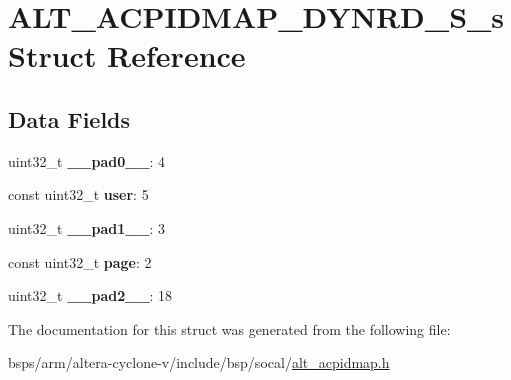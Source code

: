 \hypertarget{structALT__ACPIDMAP__DYNRD__S__s}{}\section{A\+L\+T\+\_\+\+A\+C\+P\+I\+D\+M\+A\+P\+\_\+\+D\+Y\+N\+R\+D\+\_\+\+S\+\_\+s Struct Reference}
\label{structALT__ACPIDMAP__DYNRD__S__s}
\subsection*{Data Fields}
\begin{DoxyCompactItemize}
\item 
\mbox{\label{structALT__ACPIDMAP__DYNRD__S__s_ac4a6a85262991dc5557f646f85ad46e1}} 
uint32\+\_\+t {\bfseries \+\_\+\+\_\+pad0\+\_\+\+\_\+}\+: 4
\item 
\mbox{\label{structALT__ACPIDMAP__DYNRD__S__s_a934eaadcaa4287dd554e69e2fd5b7040}} 
const uint32\+\_\+t {\bfseries user}\+: 5
\item 
\mbox{\label{structALT__ACPIDMAP__DYNRD__S__s_a8cd0899f9a42e5da76f55bffbe92ee62}} 
uint32\+\_\+t {\bfseries \+\_\+\+\_\+pad1\+\_\+\+\_\+}\+: 3
\item 
\mbox{\label{structALT__ACPIDMAP__DYNRD__S__s_a935330a9e9a0fc207be6679eaaea85c8}} 
const uint32\+\_\+t {\bfseries page}\+: 2
\item 
\mbox{\label{structALT__ACPIDMAP__DYNRD__S__s_a0fd31db34608a4b78cd8e6d23986f129}} 
uint32\+\_\+t {\bfseries \+\_\+\+\_\+pad2\+\_\+\+\_\+}\+: 18
\end{DoxyCompactItemize}


The documentation for this struct was generated from the following file\+:\begin{DoxyCompactItemize}
\item 
bsps/arm/altera-\/cyclone-\/v/include/bsp/socal/\mbox{\hyperlink{alt__acpidmap_8h}{alt\+\_\+acpidmap.\+h}}\end{DoxyCompactItemize}
